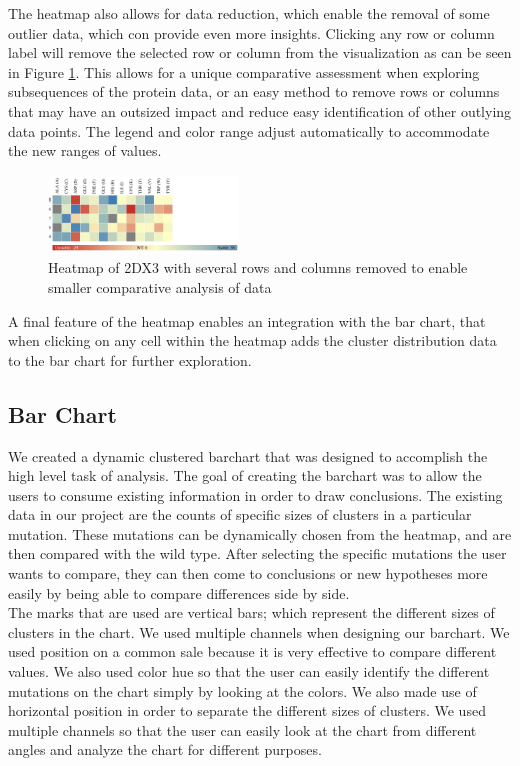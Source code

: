 \documentclass[11pt]{IEEEtran}
\begin{document}
The heatmap also allows for data reduction, which enable the removal of some outlier data, which con provide even more insights. Clicking any row or column label will remove the selected row or column from the visualization as can be seen in Figure \ref{fig:heatmapreduced}. This allows for a unique comparative assessment when exploring subsequences of the protein data, or an easy method to remove rows or columns that may have an outsized impact and reduce easy identification of other outlying data points. The legend and color range adjust automatically to accommodate the new ranges of values. \\
\begin{figure}[ht]
  \center
  \includegraphics[width=0.45\textwidth]{figs/heatmap_reduced.png}
  \caption{Heatmap of 2DX3 with several rows and columns removed to enable smaller comparative analysis of data}
  \label{fig:heatmapreduced}
\end{figure}

A final feature of the heatmap enables an integration with the bar chart, that when clicking on any cell within the heatmap adds the cluster distribution data to the bar chart for further exploration. 


\subsection{Bar Chart}\label{AA}
We created a dynamic clustered barchart that was designed to accomplish the high level task of analysis. The goal of creating the barchart was to allow the users to consume existing information in order to draw conclusions. The existing data in our project are the counts of specific sizes of clusters in a particular mutation. These mutations can be dynamically chosen from the heatmap, and are then compared with the wild type. After selecting the specific mutations the user wants to compare, they can then come to conclusions or new hypotheses more easily by being able to compare differences side by side. \\

The marks that are used are vertical bars; which represent the different sizes of clusters in the chart. We used multiple channels when designing our barchart. We used position on a common sale because it is very effective to compare different values. We also used color hue so that the user can easily identify the different mutations on the chart simply by looking at the colors. We also made use of horizontal position in order to separate the different sizes of clusters. We used multiple channels so that the user can easily look at the chart from different angles and analyze the chart for different purposes.\\ 
\end{document}
